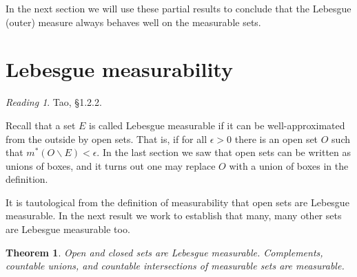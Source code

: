 \documentclass[11pt,oneside]{amsbook}
\renewcommand{\setminus}{\smallsetminus}
\theoremstyle{definition}
\theoremstyle{plain}
\newtheorem{thm}{Theorem}[section]
\theoremstyle{definition}
\theoremstyle{remark}
\newtheorem*{reading}{Reading}
\numberwithin{equation}{section}
\numberwithin{figure}{section}
\begin{document}
In the next section we will use these partial results to conclude that the Lebesgue (outer) measure always behaves well on the measurable sets.

\newpage
\section{Lebesgue measurability}

\begin{reading}
  Tao, \S 1.2.2.
\end{reading}

Recall that a set $E$ is called Lebesgue measurable if it can be well-approximated from the outside by open sets. That is, if for all $\epsilon>0$ there is an open set $O$ such that $m^*(O\setminus E)<\epsilon$. In the last section we saw that open sets can be written as unions of boxes, and it turns out one may replace $O$ with a union of boxes in the definition.

It is tautological from the definition of measurability that open sets are Lebesgue measurable. In the next result we work to establish that many, many other sets are Lebesgue measurable too.

\begin{thm}
  Open and closed sets are Lebesgue measurable. Complements, countable unions, and countable intersections of measurable sets are measurable.
\end{thm}
\end{document}
